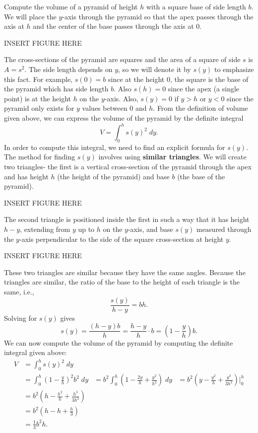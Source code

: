 \documentclass{ximera}
\begin{document}
\begin{example} Compute the volume of a pyramid of height $h$ with a square base of side length $b$.\\
We will place the $y$-axis through the pyramid so that the apex passes through the axis at $h$ and the center of the base passes through 
the axis at $0$.

INSERT FIGURE HERE

The cross-sections of the pyramid are squares and the area of a square of side $s$ is $A = s^2$.
The side length depends on $y$, so we will denote it by $s(y)$ to emphasize this fact. For example, $s(0) = b$ since at the height $0$, the square is 
the base of the pyramid which has side length $b$. Also $s(h) = 0$ since the apex (a single point) is at the height $h$ on the $y$-axis.
Also, $s(y) = 0$ if $y>h$ or $y<0$ since the pyramid only exists for $y$ values between $0$ and $h$.
From the definition of volume given above, we can express the volume of the pyramid by the definite integral 
\[
V = \int_0^h s(y)^2 \; dy.
\]
In order to compute this integral, we need to find an explicit formula for $s(y)$.
The method for finding $s(y)$ involves using \textbf{similar triangles}. We will create two triangles- 
the first is a vertical cross-section of the pyramid through the apex and has height $h$ (the height of the pyramid) 
and base $b$ (the base of the pyramid). 

INSERT FIGURE HERE

The second triangle is positioned inside the first in such a way that it has height $h-y$, extending from $y$ up to $h$ on the $y$-axis,
and base $s(y)$ measured through the $y$-axis perpendicular to the side of the square cross-section at height $y$.

INSERT FIGURE HERE

These two triangles are similar because they have the same angles. Because the triangles are similar, the ratio of the base to 
the height of each triangle is the same, 
i.e.,
\[
\frac{s(y)}{h-y} = {b}{h}.
\]
 Solving for $s(y)$ gives
 \[
 s(y) = \frac{(h-y)b}{h} = \frac{h-y}{h} \cdot b = \left(1-\frac{y}{h}\right)b.
 \]
 We can now compute the volume of the pyramid by computing the definite integral given above:
 \begin{align*}
 V &= \int_0^h s(y)^2 \; dy\\
   &= \int_0^h \left(1-\frac{y}{h}\right)^2b^2 \; dy
   &= b^2 \int_0^h \left(1 - \frac{2y}{h} + \frac{y^2}{h^2}\right)\; dy
   &= b^2 \left(y - \frac{y^2}{h} + \frac{y^3}{3h^2}\right)\bigg|_0^h\\
   &= b^2 \left(h - \frac{h^2}{h} + \frac{h^3}{3h^2}\right)\\
   &= b^2 \left(h - h + \frac{h}{3}\right)\\
   &= \frac13 b^2h.
\end{align*}

\begin{center}
\end{center}


\end{example}
 
\end{document}
